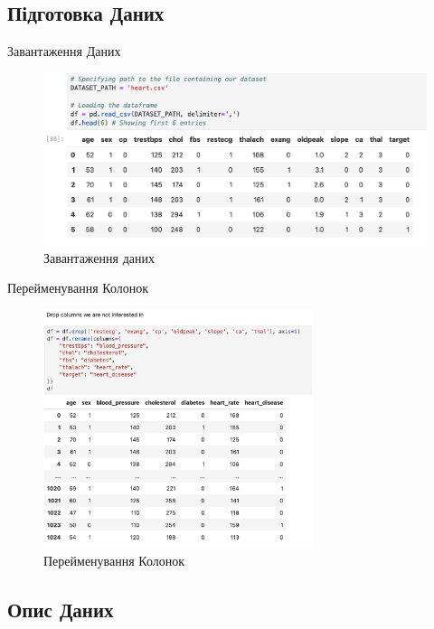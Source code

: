 \documentclass{beamer}
\begin{document}
    \subsection{Підготовка Даних}

    \begin{frame}{Завантаження Даних}
        \begin{figure}
            \centering
            \includegraphics[width=\textwidth]{images/importing.png}
            \caption{Завантаження даних}
        \end{figure}
    \end{frame}

    \begin{frame}{Перейменування Колонок}
        \begin{figure}
            \centering
            \includegraphics[width=0.7\textwidth]{images/renaming.png}
            \caption{Перейменування Колонок}
        \end{figure}
    \end{frame}

    \subsection{Опис Даних}
\end{document}
